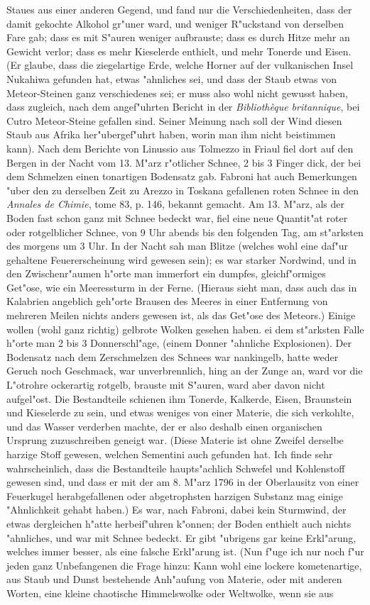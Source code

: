 \documentclass[a4paper, 11pt, oneside, polutonikogreek, german]{article}
\begin{document}
Staues aus einer anderen Gegend, und fand nur die Verschiedenheiten, dass der damit gekochte Alkohol gr"uner ward, und weniger R"uckstand von derselben Fare gab; dass es mit S"auren weniger aufbrauste; dass es durch Hitze mehr an Gewicht verlor; dass es mehr Kieselerde enthielt, und mehr Tonerde und Eisen. (Er glaube, dass die ziegelartige Erde, welche Horner auf der vulkanischen Insel Nukahiwa gefunden hat, etwas "ahnliches sei, und dass der Staub etwas von Meteor-Steinen ganz verschiedenes sei; er muss also wohl nicht gewusst haben, dass zugleich, nach dem angef"uhrten Bericht in der \emph{Bibliothèque britannique}, bei Cutro Meteor-Steine gefallen sind. Seiner Meinung nach soll der Wind diesen Staub aus Afrika her"ubergef"uhrt haben, worin man ihm nicht beistimmen kann). Nach dem Berichte von Linussio aus Tolmezzo in Friaul fiel dort auf den Bergen in der Nacht vom 13. M"arz r"otlicher Schnee, 2 bis 3 Finger dick, der bei dem Schmelzen einen tonartigen Bodensatz gab. Fabroni hat auch Bemerkungen "uber den zu derselben Zeit zu Arezzo in Toskana gefallenen roten Schnee in den \emph{Annales de Chimie}, tome 83, p. 146, bekannt gemacht. Am 13. M"arz, als der Boden fast schon ganz mit Schnee bedeckt war, fiel eine neue Quantit"at roter oder rotgelblicher Schnee, von 9 Uhr abends bis den folgenden Tag, am st"arksten des morgens um 3 Uhr. In der Nacht sah man Blitze (welches wohl eine daf"ur gehaltene Feuererscheinung wird gewesen sein); es war starker Nordwind, und in den Zwischenr"aumen h"orte man immerfort ein dumpfes, gleichf"ormiges Get"ose, wie ein Meeressturm in der Ferne. (Hieraus sieht man, dass auch das in Kalabrien angeblich geh"orte Brausen des Meeres in einer Entfernung von mehreren Meilen nichts anders gewesen ist, als das Get"ose des Meteors.) Einige wollen (wohl ganz richtig) gelbrote Wolken gesehen haben. ei dem st"arksten Falle h"orte man 2 bis 3 Donnerschl"age, (einem Donner "ahnliche Explosionen). Der Bodensatz nach dem Zerschmelzen des Schnees war nankingelb, hatte weder Geruch noch Geschmack, war unverbrennlich, hing an der Zunge an, ward vor die L"otrohre ockerartig rotgelb, brauste mit S"auren, ward aber davon nicht aufgel"ost. Die Bestandteile schienen ihm Tonerde, Kalkerde, Eisen, Braunstein und Kieselerde zu sein, und etwas weniges von einer Materie, die sich verkohlte, und das Wasser verderben machte, der er also deshalb einen organischen Ursprung zuzuschreiben geneigt war. (Diese Materie ist ohne Zweifel derselbe harzige Stoff gewesen, welchen Sementini auch gefunden hat. Ich finde sehr wahrscheinlich, dass die Bestandteile haupts"achlich Schwefel und Kohlenstoff gewesen sind, und dass er mit der am 8. M"arz 1796 in der Oberlausitz von einer Feuerkugel herabgefallenen oder abgetrophsten harzigen Substanz mag einige "Ahnlichkeit gehabt haben.) Es war, nach Fabroni, dabei kein Sturmwind, der etwas dergleichen h"atte herbeif"uhren k"onnen; der Boden enthielt auch nichts "ahnliches, und war mit Schnee bedeckt. Er gibt "ubrigens gar keine Erkl"arung, welches immer besser, als eine falsche Erkl"arung ist. (Nun f"uge ich nur noch f"ur jeden ganz Unbefangenen die Frage hinzu: Kann wohl eine lockere kometenartige, aus Staub und Dunst bestehende Anh"aufung von Materie, oder mit anderen Worten, eine kleine chaotische Himmelswolke oder Weltwolke, wenn sie aus 
\end{document}
